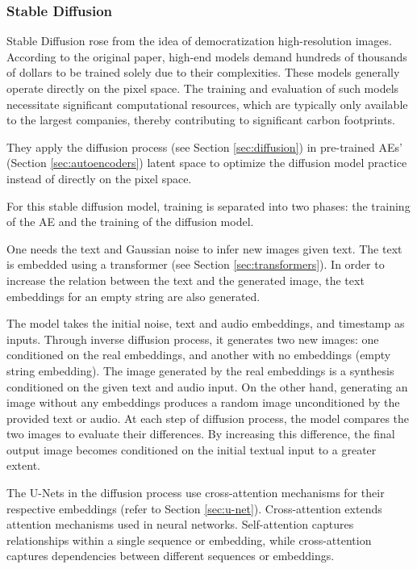 \subsubsection{Stable Diffusion} \label{sec:stable-diffusion}

Stable Diffusion \cite{rombach_high-resolution_2021} rose from the idea of democratization high-resolution images. According to the original paper, high-end models demand hundreds of thousands of dollars to be trained solely due to their complexities. These models generally operate directly on the pixel space. The training and evaluation of such models necessitate significant computational resources, which are typically only available to the largest companies, thereby contributing to significant carbon footprints.

They apply the diffusion process (see Section \ref{sec:diffusion}) in pre-trained \acp{AE}' (Section \ref{sec:autoencoders}) latent space to optimize the diffusion model practice instead of directly on the pixel space.

For this stable diffusion model, training is separated into two phases: the training of the \ac{AE} and the training of the diffusion model.

One needs the text and Gaussian noise to infer new images given text. The text is embedded using a transformer (see Section \ref{sec:transformers}). In order to increase the relation between the text and the generated image, the text embeddings for an empty string are also generated.

The model takes the initial noise, text and audio embeddings, and timestamp as inputs. Through inverse diffusion process, it generates two new images: one conditioned on the real embeddings, and another with no embeddings (empty string embedding). The image generated by the real embeddings is a synthesis conditioned on the given text and audio input. On the other hand, generating an image without any embeddings produces a random image unconditioned by the provided text or audio. At each step of diffusion process, the model compares the two images to evaluate their differences. By increasing this difference, the final output image becomes conditioned on the initial textual input to a greater extent.

The U-Nets in the diffusion process use cross-attention mechanisms for their respective embeddings (refer to Section \ref{sec:u-net}). Cross-attention extends attention mechanisms used in neural networks. Self-attention captures relationships within a single sequence or embedding, while cross-attention captures dependencies between different sequences or embeddings.


